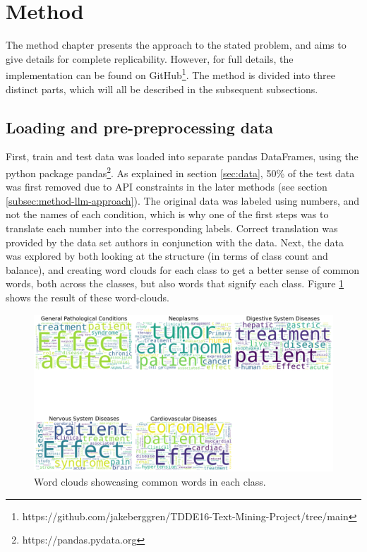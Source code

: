 \section{Method}
\label{sec:method}


The method chapter presents the approach to the stated problem, and aims to give details for complete replicability. However, for full details, the implementation can be found on GitHub\footnote{https://github.com/jakeberggren/TDDE16-Text-Mining-Project/tree/main}. The method is divided into three distinct parts, which will all be described in the subsequent subsections. 

\subsection{Loading and pre-preprocessing data}
\label{subsec:method-data}

First, train and test data was loaded into separate pandas DataFrames, using the python package pandas\footnote{https://pandas.pydata.org}. As explained in section \ref{sec:data}, 50\% of the test data was first removed due to API constraints in the later methods (see section \ref{subsec:method-llm-approach}). The original data was labeled using numbers, and not the names of each condition, which is why one of the first steps was to translate each number into the corresponding labels. Correct translation was provided by the data set authors in conjunction with the data. Next, the data was explored by both looking at the structure (in terms of class count and balance), and creating word clouds for each class to get a better sense of common words, both across the classes, but also words that signify each class. Figure \ref{fig:word-clouds} shows the result of these word-clouds.

\begin{figure}[ht]
    \centering
    \includegraphics[width=\columnwidth]{report/figures/word-clouds.png}
    \caption{Word clouds showcasing common words in each class.}
    \label{fig:word-clouds}
\end{figure}


